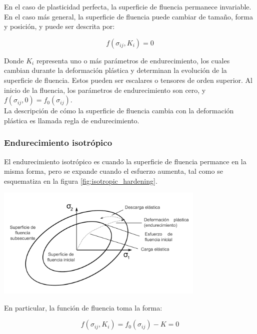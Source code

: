 En el caso de plasticidad perfecta, la superficie de fluencia permanece invariable. En el caso 
más general, la superficie de fluencia puede cambiar de tamaño, forma y posición, y puede ser 
descrita por:

\begin{equation}
f(\sigma_{ij}, K_i) = 0
\end{equation}

Donde $K_i$ representa uno o más parámetros de endurecimiento, los cuales cambian durante la 
deformación plástica y determinan la evolución de la superficie de fluencia. Estos pueden 
ser escalares o tensores de orden superior. Al inicio de la fluencia, los parámetros de 
endurecimiento son cero, y $f(\sigma_{ij}, 0) = f_0(\sigma_{ij}) $. \\

La descripción de cómo la superficie de fluencia cambia con la deformación plástica es 
llamada regla de endurecimiento. 

\subsubsection{Endurecimiento isotrópico}

El endurecimiento isotrópico es cuando la superficie de fluencia permance en la misma forma, 
pero se expande cuando el esfuerzo aumenta, tal como se esquematiza en la figura \ref{fig:isotropic_hardening}.

\begin{center}
\includegraphics[width=0.75\textwidth]{src/ch2/isotropic_hardening}
\label{fig:isotropic_hardening}
\end{center}

En particular, la función de fluencia toma la forma:

\begin{equation}
f(\sigma_{ij}, K_i) = f_0 ( \sigma_{ij} ) - K = 0
\end{equation}

